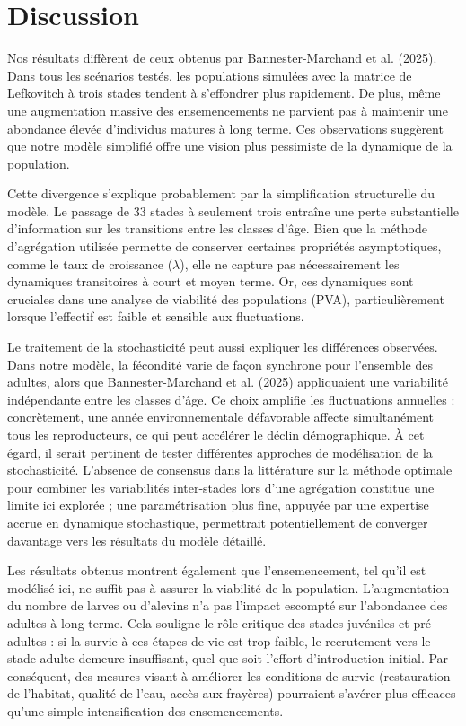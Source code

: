 \documentclass[9pt,twocolumn,twoside,]{pnas-new}
\begin{document}
\section*{Discussion}\label{discussion}

\indent Nos résultats diffèrent de ceux obtenus par Bannester-Marchand
et al. (2025). Dans tous les scénarios testés, les populations simulées
avec la matrice de Lefkovitch à trois stades tendent à s'effondrer plus
rapidement. De plus, même une augmentation massive des ensemencements ne
parvient pas à maintenir une abondance élevée d'individus matures à long
terme. Ces observations suggèrent que notre modèle simplifié offre une
vision plus pessimiste de la dynamique de la population.

\indent Cette divergence s'explique probablement par la simplification
structurelle du modèle. Le passage de 33 stades à seulement trois
entraîne une perte substantielle d'information sur les transitions entre
les classes d'âge. Bien que la méthode d'agrégation utilisée permette de
conserver certaines propriétés asymptotiques, comme le taux de
croissance (\(\lambda\)), elle ne capture pas nécessairement les
dynamiques transitoires à court et moyen terme. Or, ces dynamiques sont
cruciales dans une analyse de viabilité des populations (PVA),
particulièrement lorsque l'effectif est faible et sensible aux
fluctuations.

Le traitement de la stochasticité peut aussi expliquer les différences
observées. Dans notre modèle, la fécondité varie de façon synchrone pour
l'ensemble des adultes, alors que Bannester-Marchand et al. (2025)
appliquaient une variabilité indépendante entre les classes d'âge. Ce
choix amplifie les fluctuations annuelles : concrètement, une année
environnementale défavorable affecte simultanément tous les
reproducteurs, ce qui peut accélérer le déclin démographique. À cet
égard, il serait pertinent de tester différentes approches de
modélisation de la stochasticité. L'absence de consensus dans la
littérature sur la méthode optimale pour combiner les variabilités
inter-stades lors d'une agrégation constitue une limite ici explorée ;
une paramétrisation plus fine, appuyée par une expertise accrue en
dynamique stochastique, permettrait potentiellement de converger
davantage vers les résultats du modèle détaillé.

Les résultats obtenus montrent également que l'ensemencement, tel qu'il
est modélisé ici, ne suffit pas à assurer la viabilité de la population.
L'augmentation du nombre de larves ou d'alevins n'a pas l'impact
escompté sur l'abondance des adultes à long terme. Cela souligne le rôle
critique des stades juvéniles et pré-adultes : si la survie à ces étapes
de vie est trop faible, le recrutement vers le stade adulte demeure
insuffisant, quel que soit l'effort d'introduction initial. Par
conséquent, des mesures visant à améliorer les conditions de survie
(restauration de l'habitat, qualité de l'eau, accès aux frayères)
pourraient s'avérer plus efficaces qu'une simple intensification des
ensemencements.
\end{document}
